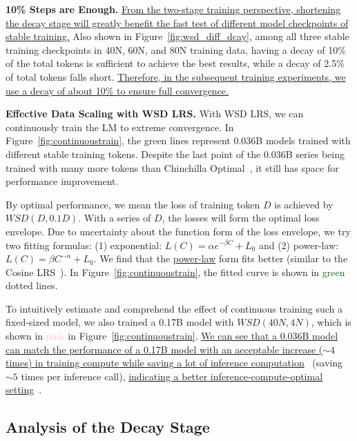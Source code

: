 \textbf{10\% Steps are Enough.} \uline{From the two-stage training perspective, shortening the decay stage will greatly benefit the fast test of different model checkpoints of stable training.} Also shown in Figure~\ref{fig:wsd_diff_dcay}, among all three stable training checkpoints in 40N, 60N, and 80N training data, having a decay of 10\% of the total tokens is sufficient to achieve the best results, while a decay of 2.5\% of total tokens falls short. \uline{Therefore, in the subsequent training experiments, we use a decay of about 10\% to ensure full convergence.}

\textbf{Effective Data Scaling with WSD LRS.} With WSD LRS, we can continuously train the LM to extreme convergence. In Figure~\ref{fig:continuoustrain}, the green lines represent 0.036B models trained with different stable training tokens. Despite the last point of the 0.036B series being trained with many more tokens than Chinchilla Optimal~\citep{hoffmann2022training}, it still has space for performance improvement. 


By optimal performance, we mean the loss of training token $D$ is achieved by ${WSD}(D, 0.1D)$. With a series of $D$, the losses will form the optimal loss envelope. Due to uncertainty about the function form of the loss envelope, we try two fitting formulas: (1) exponential: $L(C) = \alpha e^{-\beta C} + L_0$ and (2) power-law: $L(C) = \beta C^{-\alpha} + L_0$. We find that the \uline{power-law} form fits better (similar to the Cosine LRS~\citep{kaplan2020scaling}). In Figure~\ref{fig:continuoustrain}, the fitted curve is shown in \textcolor{darkgreen}{green} dotted lines.

To intuitively estimate and comprehend the effect of continuous training such a fixed-sized model, we also trained a 0.17B model with $WSD(40N, 4N)$, which is shown in \textcolor{pink}{pink} in Figure~\ref{fig:continuoustrain}. \uline{We can see that a 0.036B model can match the performance of a 0.17B model with an acceptable increase ($\sim 4$ times) in training compute while saving a lot of inference computation}~\citep{sardana2023beyond} (saving $\sim 5$ times per inference call), \uline{indicating a better inference-compute-optimal setting}~\citep{sardana2023beyond}.

\subsection{Analysis of the Decay Stage}

